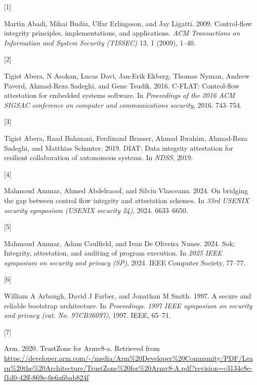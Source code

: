 \documentclass[a4paper, nobind]{templates/ociamthesis}
\newlength{\cslhangindent}
\newlength{\csllabelwidth}
\newenvironment{CSLReferences}[2] %
{\begin{list}{}{%
	\setlength{\itemindent}{0pt}
	\setlength{\leftmargin}{0pt}
	\setlength{\parsep}{0pt}
	\ifodd #1
	\setlength{\leftmargin}{\cslhangindent}
	\setlength{\itemindent}{-1\cslhangindent}
	\fi
	\setlength{\itemsep}{#2\baselineskip}}}
{\end{list}}
\newcommand{\CSLLeftMargin}[1]{\parbox[t]{\csllabelwidth}{\strut#1\strut}}
\newcommand{\CSLRightInline}[1]{\parbox[t]{\linewidth - \csllabelwidth}{\strut#1\strut}}
\begin{document}
\label{refs}
\begin{CSLReferences}{0}{0}
\CSLLeftMargin{{[}1{]} }%
\CSLRightInline{Martı́n Abadi, Mihai Budiu, Ulfar Erlingsson, and Jay Ligatti. 2009. Control-flow integrity principles, implementations, and applications. \emph{ACM Transactions on Information and System Security (TISSEC)} 13, 1 (2009), 1--40.}

\CSLLeftMargin{{[}2{]} }%
\CSLRightInline{Tigist Abera, N Asokan, Lucas Davi, Jan-Erik Ekberg, Thomas Nyman, Andrew Paverd, Ahmad-Reza Sadeghi, and Gene Tsudik. 2016. C-FLAT: Control-flow attestation for embedded systems software. In \emph{Proceedings of the 2016 ACM SIGSAC conference on computer and communications security}, 2016. 743--754.}

\CSLLeftMargin{{[}3{]} }%
\CSLRightInline{Tigist Abera, Raad Bahmani, Ferdinand Brasser, Ahmad Ibrahim, Ahmad-Reza Sadeghi, and Matthias Schunter. 2019. DIAT: Data integrity attestation for resilient collaboration of autonomous systems. In \emph{NDSS}, 2019.}

\CSLLeftMargin{{[}4{]} }%
\CSLRightInline{Mahmoud Ammar, Ahmed Abdelraoof, and Silviu Vlasceanu. 2024. On bridging the gap between control flow integrity and attestation schemes. In \emph{33rd USENIX security symposium (USENIX security 24)}, 2024. 6633--6650.}

\CSLLeftMargin{{[}5{]} }%
\CSLRightInline{Mahmoud Ammar, Adam Caulfield, and Ivan De Oliveira Nunes. 2024. Sok: Integrity, attestation, and auditing of program execution. In \emph{2025 IEEE symposium on security and privacy (SP)}, 2024. IEEE Computer Society, 77--77.}

\CSLLeftMargin{{[}6{]} }%
\CSLRightInline{William A Arbaugh, David J Farber, and Jonathan M Smith. 1997. A secure and reliable bootstrap architecture. In \emph{Proceedings. 1997 IEEE symposium on security and privacy (cat. No. 97CB36097)}, 1997. IEEE, 65--71.}

\CSLLeftMargin{{[}7{]} }%
\CSLRightInline{Arm. 2020. TrustZone for Armv8-a. Retrieved from \url{https://developer.arm.com/-/media/Arm\%20Developer\%20Community/PDF/Learn\%20the\%20Architecture/TrustZone\%20for\%20Armv8-A.pdf?revision=c3134c8e-f1d0-42ff-869e-0e6a6bab824f}}


\end{CSLReferences}
\end{document}

